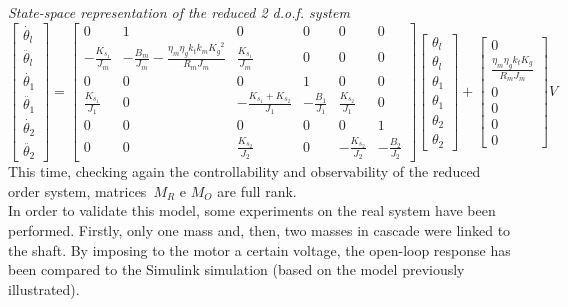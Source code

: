 \textit{State-space representation of the reduced 2 d.o.f. system}
\begin{equation}
	\begin{bmatrix}
		\dot{\theta_l} \\
		\ddot{\theta_l} \\
		\dot{\theta_1} \\
		\ddot{\theta_1} \\
		\dot{\theta_2} \\
		\ddot{\theta_2}
	\end{bmatrix}
	=
	\begin{bmatrix}
		0 &1 & 0 & 0 & 0 & 0 \\
		-\frac{K_{s_1}}{J_m} & -\frac{B_m}{J_m}-\frac{\eta_m \eta_g k_t k_m {K_g}^2}{R_m J_m}  & \frac{K_{s_1}}{J_m} & 0 & 0 & 0 \\
		0 & 0 & 0 & 1 & 0 & 0 \\
		\frac{K_{s_1}}{J_1} & 0 & -\frac{K_{s_1}+K_{s_2}}{J_1} & -\frac{B_1}{J_1} & \frac{K_{s_2}}{J_1} & 0 \\
		0 & 0 & 0 & 0 & 0 & 1 \\
		0 & 0 & \frac{K_{s_2}}{J_2} & 0 & -\frac{K_{s_2}}{J_2} & -\frac{B_2}{J_2}
	\end{bmatrix}
	\begin{bmatrix}
		\theta_l \\
		\theta_l \\
		\theta_1 \\
		\theta_1 \\
		\theta_2 \\
		\theta_2
	\end{bmatrix}
	+
	\begin{bmatrix}
		0 \\
		\frac{\eta_m \eta_g k_t K_g}{R_m J_m} \\
		0 \\
		0 \\
		0 \\
		0
	\end{bmatrix}
	V
\end{equation}
This time, checking again the controllability and observability of the reduced order system, matrices~$M_R$ e $M_O$ are full rank. \\

In order to validate this model, some experiments on the real system have been performed. Firstly, only one mass and, then, two masses in cascade were linked to the shaft. By imposing to the motor a certain voltage, the open-loop response has been compared to the Simulink simulation (based on the model previously illustrated).

